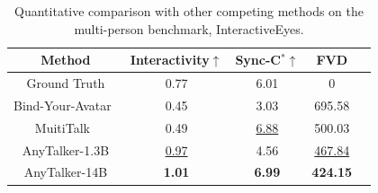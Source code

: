 \begin{table}[t]
    \centering
    \small
    \caption{
        Quantitative comparison with other competing methods on the multi-person benchmark, InteractiveEyes.
    }
    \begin{tabular}{ccccc}
    \toprule
    \textbf{Method} & \textbf{Interactivity$\uparrow$} & \textbf{Sync-C$^{*}$$\uparrow$} & \textbf{FVD} \\
    \midrule
    Ground Truth & 0.77 & 6.01 & 0 \\
     \midrule
    Bind-Your-Avatar~\cite{huang2025bind} & 0.45 & 3.03 & 695.58  \\
    MuitiTalk~\cite{kong2025let} & 0.49 & \underline{6.88} & 500.03  \\
    AnyTalker-1.3B & \underline{0.97} & 4.56 & \underline{467.84}  \\
    AnyTalker-14B & \textbf{1.01} & \textbf{6.99} & \textbf{424.15}   \\
    \bottomrule
    \end{tabular}
    \label{tab:multi-benchmark}
\end{table}